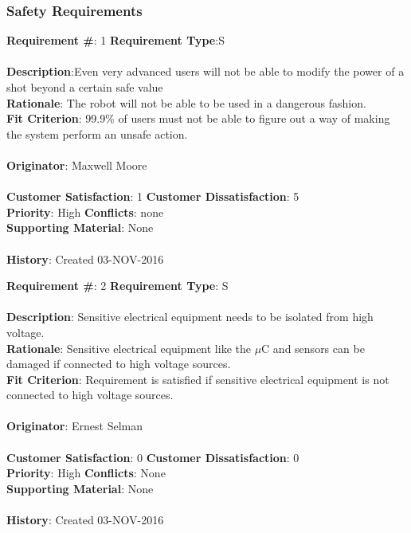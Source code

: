 \documentclass[titlepage]{article}
\begin{document}
\subsubsection{Safety Requirements}
\begin{framed}
	\noindent\textbf{Requirement \#}: 1 \hfill \textbf{Requirement Type}:S \hfill\\\\
	\noindent\textbf{Description}:Even very advanced users will not be able to modify the power of a shot beyond a certain safe value\\
	\textbf{Rationale}: The robot will not be able to be used in a dangerous fashion.\\
	\textbf{Fit Criterion}: 99.9\% of users must not be able to figure out a way of making the system perform an unsafe action.\\\\
	\textbf{Originator}: Maxwell Moore\\\\
	\noindent\textbf{Customer Satisfaction}: 1 \hfill 	\textbf{Customer Dissatisfaction}: 5 \hfill\\
	\textbf{Priority}: High \hfill \textbf{Conflicts}: none \hfill\\
	\textbf{Supporting Material}: None\\\\
	\noindent\textbf{History}: Created 03-NOV-2016
\end{framed}

\begin{framed}
	\noindent\textbf{Requirement \#}: 2 \hfill \textbf{Requirement Type}: S \hfill\\\\
	\noindent\textbf{Description}: Sensitive electrical equipment needs to be isolated from high voltage.\\
	\textbf{Rationale}: Sensitive electrical equipment like the $\mu$C and sensors can be damaged if connected to high voltage sources.\\
	\textbf{Fit Criterion}: Requirement is satisfied if sensitive electrical equipment is not connected to high voltage sources. \\\\
	\textbf{Originator}: Ernest Selman\\\\
	\noindent\textbf{Customer Satisfaction}: 0 \hfill 	\textbf{Customer Dissatisfaction}: 0 \hfill\\
	\textbf{Priority}: High \hfill \textbf{Conflicts}: None \hfill\\
	\textbf{Supporting Material}: None\\\\
	\noindent\textbf{History}: Created 03-NOV-2016
\end{framed}
\end{document}
